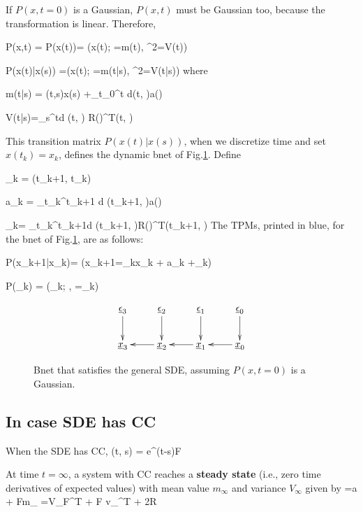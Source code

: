 If $P(x,t=0)$ is a Gaussian, $P(x,t)$ must be Gaussian too,
because the transformation is linear. Therefore,

\beq
P(x,t) = P(x(t))=
\caln(x(t); \mu=m(t), \Sigma^2=V(t))
\eeq

\beq
P(x(t)|x(s)) =\caln(x(t); \mu=m(t|s), \Sigma^2=V(t|s))
\eeq
where

\beq
m(t|s) =
\Psi(t,s)x(s)
+\int_{t_0}^t d\tau \Psi(t, \tau)a(\tau)
\eeq

\beq
V(t|s)=\int_s^td\tau\;
\Psi(t, \tau)
R(\tau)\Psi^T(t, \tau)
\eeq

This transition matrix $P(x(t)|x(s))$, when we discretize time and set $x(t_k)=x_k$, defines the 
dynamic bnet of Fig.\ref{fig-1st-2nd-order-bnet}.
Define

\beq 
\Psi_k = \Psi(t_{k+1}, t_k)
\eeq

\beq
a_k = \int_{t_k}^{t_{k+1}}
d\tau\; \Psi(t_{k+1}, \tau)a(\tau)
\eeq

\beq
\Sigma_k=
\int_{t_k}^{t_{k+1}}d\tau\;
\Psi(t_{k+1}, \tau)R(\tau)\Psi^T(t_{k+1}, \tau)
\eeq
The TPMs,
printed in blue, for the bnet of Fig.\ref{fig-1st-2nd-order-bnet}, are as follows:

\beq \color{blue}
P(x_{k+1}|x_k)= \indi(x_{k+1}=\Psi_kx_k + a_k +\eps_k)
\eeq

\beq \color{blue}
P(\eps_k) = \caln(\eps_k; , \Sigma=\Sigma_k)
\eeq




\begin{figure}[h!]
$$
\xymatrix{
\ul{\eps}_3 \ar[d]
& \ul{\eps}_2 \ar[d]
& \ul{\eps}_1 \ar[d]
& \ul{\eps}_0\ar[d]
\\
\rvx_3 
& \rvx _2 \ar[l]
& \rvx_1 \ar[l]
& \rvx_0\ar[l]
}
$$
\caption{Bnet that satisfies the general SDE, 
assuming $P(x,t=0)$ is a Gaussian.}
\label{fig-1st-2nd-order-bnet}
\end{figure}





\subsection{In case SDE has CC}
When the SDE has CC,
\beq
\Psi(t, s) = e^{(t-s)F}
\eeq


At time $t=\infty$, 
a system with CC reaches
a {\bf steady state} (i.e., zero time derivatives of expected values)
with mean value $m_\infty$
and variance $V_\infty$ given by
=a + Fm_\infty
\eeq
{}=V_\infty F^T  + F v_\infty^T + 2R 
\eeq


